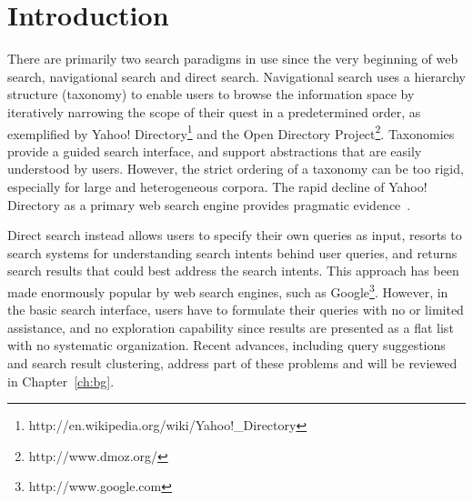 \chapter{Introduction}
\label{ch:intro}


There are primarily two search paradigms in use since the very beginning of web search, navigational search and direct search. Navigational search uses a hierarchy structure (taxonomy) to enable users to browse the information space by iteratively narrowing the scope of their quest in a predetermined order, as exemplified by Yahoo! Directory\footnote{http://en.wikipedia.org/wiki/Yahoo!\_Directory} and the Open Directory Project\footnote{http://www.dmoz.org/}. Taxonomies provide a guided search interface, and support abstractions that are easily understood by users. However, the strict ordering of a taxonomy can be too rigid, especially for large and heterogeneous corpora. The rapid decline of Yahoo! Directory as a primary web search engine provides pragmatic evidence~\cite{sacco2009dynamic}.

Direct search instead allows users to specify their own queries as input, resorts to search systems for understanding search intents behind user queries, and returns search results that could best address the search intents. This approach has been made enormously popular by web search engines, such as Google\footnote{http://www.google.com}. However, in the basic search interface, users have to formulate their queries with no or limited assistance, and no exploration capability since results are presented as a flat list with no systematic organization. Recent advances, including query suggestions and search result clustering, address part of these problems and will be reviewed in Chapter~\ref{ch:bg}.


